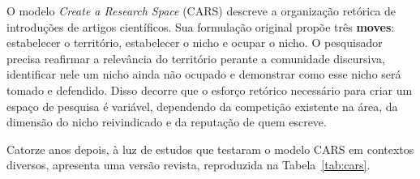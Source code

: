 O modelo \textit{Create a Research Space} (CARS) descreve a organização retórica de introduções de artigos científicos. Sua formulação original \cite{GenreAnalysis} propõe três \textbf{moves}: estabelecer o território, estabelecer o nicho e ocupar o nicho. O pesquisador precisa reafirmar a relevância do território perante a comunidade discursiva, identificar nele um nicho ainda não ocupado e demonstrar como esse nicho será tomado e defendido. Disso decorre que o esforço retórico necessário para criar um espaço de pesquisa é variável, dependendo da competição existente na área, da dimensão do nicho reivindicado e da reputação de quem escreve.

Catorze anos depois, à luz de estudos que testaram o modelo CARS em contextos diversos, \cite{ResearchGenres} apresenta uma versão revista, reproduzida na Tabela~\ref{tab:cars}. 

